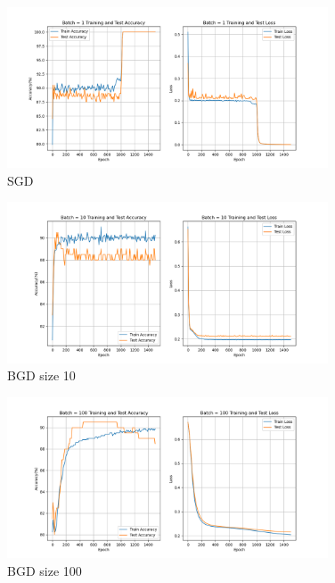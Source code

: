 \documentclass{article}
\begin{document}
\begin{figure}[!htbp]
    \centering
    \includegraphics[width=0.85\textwidth]{img/Part2/curve_batch_1.png}
    \caption{SGD}
    \label{fig:p2batch1}
\end{figure}

\begin{figure}[!htbp]
    \centering
    \includegraphics[width=0.85\textwidth]{img/Part2/curve_batch_10.png}
    \caption{BGD size 10}
    \label{fig:p2batch10}
\end{figure}

\begin{figure}[!htbp]
    \centering
    \includegraphics[width=0.85\textwidth]{img/Part2/curve_batch_100.png}
    \caption{BGD size 100}
    \label{fig:p2batch100}
\end{figure}
\end{document}
